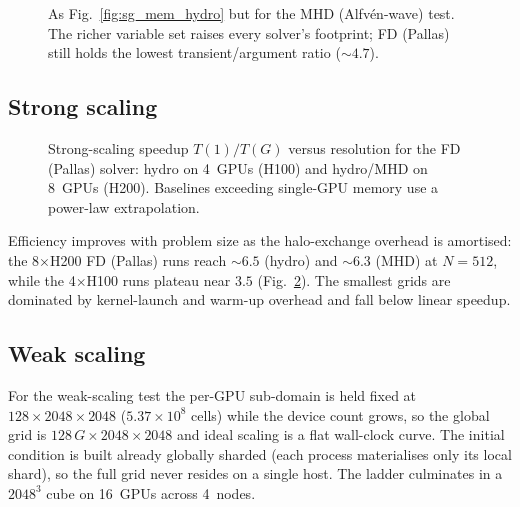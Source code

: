 \begin{figure}
    \centering
    
    \caption{As Fig.~\ref{fig:sg_mem_hydro} but for the MHD (Alfv\'en-wave)
    test. The richer variable set raises every solver's footprint; FD
    (Pallas) still holds the lowest transient/argument ratio ($\sim\!4.7$).}
    \label{fig:sg_mem_mhd}
\end{figure}

\subsection{Strong scaling}

\begin{figure}
    \centering
    
    \caption{Strong-scaling speedup $T(1)/T(G)$ versus resolution for the
    FD (Pallas) solver: hydro on 4~GPUs (H100) and hydro/MHD on 8~GPUs
    (H200). Baselines exceeding single-GPU memory use a power-law
    extrapolation.}
    \label{fig:strong_speedup}
\end{figure}

Efficiency improves with problem size as the halo-exchange overhead is
amortised: the 8$\times$H200 FD (Pallas) runs reach $\sim\!6.5$ (hydro) and
$\sim\!6.3$ (MHD) at $N=512$, while the 4$\times$H100 runs plateau near
$3.5$ (Fig.~\ref{fig:strong_speedup}). The smallest grids are dominated by
kernel-launch and warm-up overhead and fall below linear speedup.

\subsection{Weak scaling}

For the weak-scaling test the per-GPU sub-domain is held fixed at
$128\times2048\times2048$ ($5.37\times10^{8}$ cells) while the device count
grows, so the global grid is $128\,G\times2048\times2048$ and ideal scaling
is a flat wall-clock curve. The initial condition is built already
globally sharded (each process materialises only its local shard), so the
full grid never resides on a single host. The ladder culminates in a
$2048^{3}$ cube on 16~GPUs across 4~nodes.

